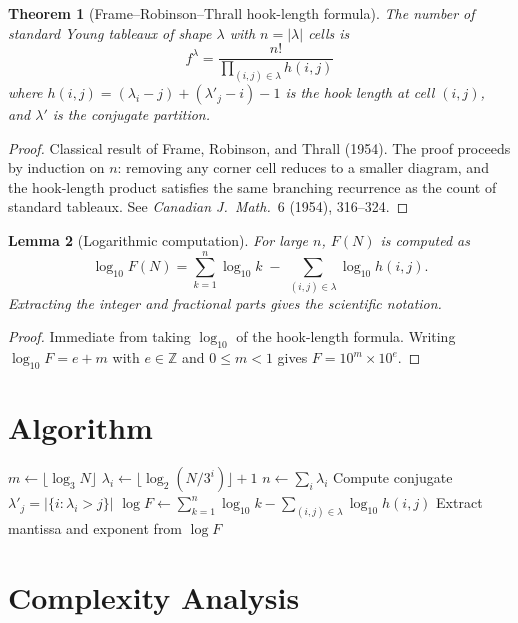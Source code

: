 \documentclass[11pt]{article}
\newtheorem{theorem}{Theorem}
\newtheorem{lemma}[theorem]{Lemma}
\begin{document}
\begin{theorem}[Frame--Robinson--Thrall hook-length formula]
\label{thm:hlf}
The number of standard Young tableaux of shape $\lambda$ with $n = |\lambda|$ cells is
\[
f^\lambda = \frac{n!}{\displaystyle\prod_{(i,j) \in \lambda} h(i,j)}
\]
where $h(i,j) = (\lambda_i - j) + (\lambda'_j - i) - 1$ is the hook length at cell $(i,j)$, and $\lambda'$ is the conjugate partition.
\end{theorem}

\begin{proof}
Classical result of Frame, Robinson, and Thrall (1954). The proof proceeds by induction on $n$: removing any corner cell reduces to a smaller diagram, and the hook-length product satisfies the same branching recurrence as the count of standard tableaux. See \emph{Canadian J.\ Math.}\ 6 (1954), 316--324.
\end{proof}

\begin{lemma}[Logarithmic computation]
\label{lem:log}
For large $n$, $F(N)$ is computed as
\[
\log_{10} F(N) = \sum_{k=1}^{n} \log_{10} k \;-\; \sum_{(i,j) \in \lambda} \log_{10} h(i,j).
\]
Extracting the integer and fractional parts gives the scientific notation.
\end{lemma}

\begin{proof}
Immediate from taking $\log_{10}$ of the hook-length formula. Writing $\log_{10} F = e + m$ with $e \in \mathbb{Z}$ and $0 \le m < 1$ gives $F = 10^m \times 10^e$.
\end{proof}

\section{Algorithm}

\begin{algorithm}[H]
\caption{Compute $F(N)$ via hook-length formula}
\begin{algorithmic}[1]
\State $m \gets \lfloor \log_3 N \rfloor$
    \State $\lambda_i \gets \lfloor \log_2(N/3^i) \rfloor + 1$
\EndFor
\State $n \gets \sum_{i} \lambda_i$
\State Compute conjugate $\lambda'_j = |\{i : \lambda_i > j\}|$
\State $\log F \gets \sum_{k=1}^{n} \log_{10} k - \sum_{(i,j) \in \lambda} \log_{10} h(i,j)$
\State Extract mantissa and exponent from $\log F$
\end{algorithmic}
\end{algorithm}

\section{Complexity Analysis}
\end{document}
